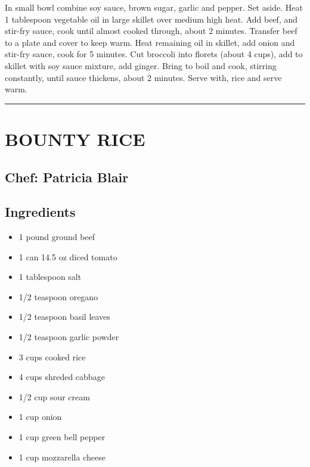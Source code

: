 \documentclass[
]{book}
\providecommand{\tightlist}{%
  \setlength{\itemsep}{0pt}\setlength{\parskip}{0pt}}
\begin{document}
In small bowl combine soy sauce, brown sugar, garlic and pepper.
Set aside. Heat 1 tablespoon vegetable oil in large skillet over
medium high heat. Add beef, and stir-fry sauce, cook until almost
cooked through, about 2 minutes. Transfer beef to a plate and cover
to keep warm. Heat remaining oil in skillet, add onion and stir-fry sauce,
cook for 5 minutes. Cut broccoli into florets (about 4 cups), add to
skillet with soy sauce mixture, add ginger. Bring to boil and cook,
stirring constantly, until sauce thickens, about 2 minutes. Serve with,
rice and serve warm.

\begin{center}\rule{0.5\linewidth}{0.5pt}\end{center}

\hypertarget{bounty-rice}{%
\section*{BOUNTY RICE}\label{bounty-rice}}


\hypertarget{chef-patricia-blair-10}{%
\subsection*{Chef: Patricia Blair}\label{chef-patricia-blair-10}}


\hypertarget{ingredients-45}{%
\subsection*{Ingredients}\label{ingredients-45}}


\begin{itemize}
\tightlist
\item
  1 pound ground beef
\item
  1 can 14.5 oz diced tomato
\item
  1 tablespoon salt
\item
  1/2 teaspoon oregano
\item
  1/2 teaspoon basil leaves
\item
  1/2 teaspoon garlic powder
\item
  3 cups cooked rice
\item
  4 cups shreded cabbage
\item
  1/2 cup sour cream
\item
  1 cup onion
\item
  1 cup green bell pepper
\item
  1 cup mozzarella cheese
\end{itemize}
\end{document}
